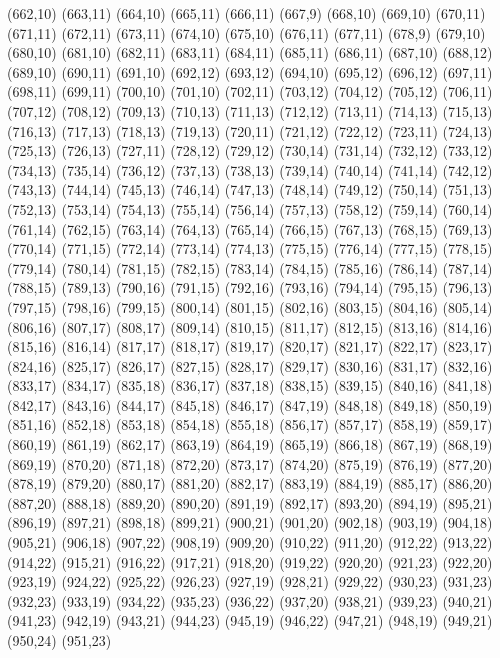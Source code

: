 (662,10)
(663,11)
(664,10)
(665,11)
(666,11)
(667,9)
(668,10)
(669,10)
(670,11)
(671,11)
(672,11)
(673,11)
(674,10)
(675,10)
(676,11)
(677,11)
(678,9)
(679,10)
(680,10)
(681,10)
(682,11)
(683,11)
(684,11)
(685,11)
(686,11)
(687,10)
(688,12)
(689,10)
(690,11)
(691,10)
(692,12)
(693,12)
(694,10)
(695,12)
(696,12)
(697,11)
(698,11)
(699,11)
(700,10)
(701,10)
(702,11)
(703,12)
(704,12)
(705,12)
(706,11)
(707,12)
(708,12)
(709,13)
(710,13)
(711,13)
(712,12)
(713,11)
(714,13)
(715,13)
(716,13)
(717,13)
(718,13)
(719,13)
(720,11)
(721,12)
(722,12)
(723,11)
(724,13)
(725,13)
(726,13)
(727,11)
(728,12)
(729,12)
(730,14)
(731,14)
(732,12)
(733,12)
(734,13)
(735,14)
(736,12)
(737,13)
(738,13)
(739,14)
(740,14)
(741,14)
(742,12)
(743,13)
(744,14)
(745,13)
(746,14)
(747,13)
(748,14)
(749,12)
(750,14)
(751,13)
(752,13)
(753,14)
(754,13)
(755,14)
(756,14)
(757,13)
(758,12)
(759,14)
(760,14)
(761,14)
(762,15)
(763,14)
(764,13)
(765,14)
(766,15)
(767,13)
(768,15)
(769,13)
(770,14)
(771,15)
(772,14)
(773,14)
(774,13)
(775,15)
(776,14)
(777,15)
(778,15)
(779,14)
(780,14)
(781,15)
(782,15)
(783,14)
(784,15)
(785,16)
(786,14)
(787,14)
(788,15)
(789,13)
(790,16)
(791,15)
(792,16)
(793,16)
(794,14)
(795,15)
(796,13)
(797,15)
(798,16)
(799,15)
(800,14)
(801,15)
(802,16)
(803,15)
(804,16)
(805,14)
(806,16)
(807,17)
(808,17)
(809,14)
(810,15)
(811,17)
(812,15)
(813,16)
(814,16)
(815,16)
(816,14)
(817,17)
(818,17)
(819,17)
(820,17)
(821,17)
(822,17)
(823,17)
(824,16)
(825,17)
(826,17)
(827,15)
(828,17)
(829,17)
(830,16)
(831,17)
(832,16)
(833,17)
(834,17)
(835,18)
(836,17)
(837,18)
(838,15)
(839,15)
(840,16)
(841,18)
(842,17)
(843,16)
(844,17)
(845,18)
(846,17)
(847,19)
(848,18)
(849,18)
(850,19)
(851,16)
(852,18)
(853,18)
(854,18)
(855,18)
(856,17)
(857,17)
(858,19)
(859,17)
(860,19)
(861,19)
(862,17)
(863,19)
(864,19)
(865,19)
(866,18)
(867,19)
(868,19)
(869,19)
(870,20)
(871,18)
(872,20)
(873,17)
(874,20)
(875,19)
(876,19)
(877,20)
(878,19)
(879,20)
(880,17)
(881,20)
(882,17)
(883,19)
(884,19)
(885,17)
(886,20)
(887,20)
(888,18)
(889,20)
(890,20)
(891,19)
(892,17)
(893,20)
(894,19)
(895,21)
(896,19)
(897,21)
(898,18)
(899,21)
(900,21)
(901,20)
(902,18)
(903,19)
(904,18)
(905,21)
(906,18)
(907,22)
(908,19)
(909,20)
(910,22)
(911,20)
(912,22)
(913,22)
(914,22)
(915,21)
(916,22)
(917,21)
(918,20)
(919,22)
(920,20)
(921,23)
(922,20)
(923,19)
(924,22)
(925,22)
(926,23)
(927,19)
(928,21)
(929,22)
(930,23)
(931,23)
(932,23)
(933,19)
(934,22)
(935,23)
(936,22)
(937,20)
(938,21)
(939,23)
(940,21)
(941,23)
(942,19)
(943,21)
(944,23)
(945,19)
(946,22)
(947,21)
(948,19)
(949,21)
(950,24)
(951,23)
